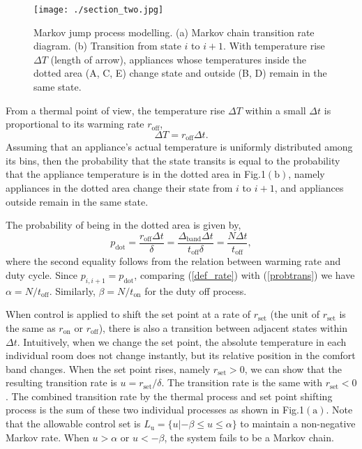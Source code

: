 \documentclass[journal]{IEEEtran}
\begin{document}
\begin{figure}[htb]
\centering
\label{trans1}
\texttt{[image: ./section\_two.jpg]}
\caption{Markov jump process modelling. (a) Markov chain transition rate diagram. (b) Transition from state $i$ to $i+1$. With temperature rise $\Delta T$ (length of arrow), appliances whose temperatures inside the dotted area (A, C, E) change state and outside (B, D) remain in the same state.}
\end{figure}

From a thermal point of view, the temperature rise $\Delta T$ within a small $\Delta t$ is proportional to its warming rate $r_{\textrm{off}}$,
\begin{equation}
\Delta T = r_{\textrm{off}}\Delta t.
\end{equation}
Assuming that an appliance's actual temperature is uniformly distributed among its bins, then the probability that the state transits is equal to the probability that the appliance temperature is in the dotted area in Fig.1$(\textrm{b})$, namely appliances in the dotted area change their state from $i$ to $i+1$, and appliances outside remain in the same state.

The probability of being in the dotted area is given by,
\begin{equation}
\label{probtrans}
p_{\textrm{dot}}=\frac{r_{\textrm{off}} \Delta t}{\delta}=\frac{\Delta_{\textrm{band}}\Delta t}{t_{\textrm{off}}\delta}=\frac{N\Delta t}{t_{\textrm{off}}},
\end{equation}
where the second equality follows from the relation between warming rate and duty cycle. Since $p_{i,i+1}=p_{\textrm{dot}}$, comparing (\ref{def_rate}) with (\ref{probtrans}) we have $\alpha=N/t_{\textrm{off}}$. Similarly, $\beta=N/t_{\textrm{on}}$ for the duty off process. 

When control is applied to shift the set point at a rate of $r_{\textrm{set}}$ (the unit of $r_{\textrm{set}}$ is the same as $r_{\textrm{on}}$ or $r_{\textrm{off}}$), there is also a transition between adjacent states within $\Delta t$. Intuitively, when we change the set point, the absolute temperature in each individual room does not change instantly, but its relative position in the comfort band changes. When the set point rises, namely $r_{\textrm{set}}>0$, we can show that the resulting transition rate is $u=r_{\textrm{set}}/\delta$. The transition rate is the same with $r_{\textrm{set}}<0$. The combined transition rate by the thermal process and set point shifting process is the sum of these two individual processes as shown in Fig.1$(\textrm{a})$. Note that the allowable control set is $\textit{L}_{\textrm{u}}=\{u|-\beta \leq u \leq \alpha\}$ to maintain a non-negative Markov rate. When $u>\alpha$ or $u<-\beta$, the system fails to be a Markov chain. 
\end{document}
